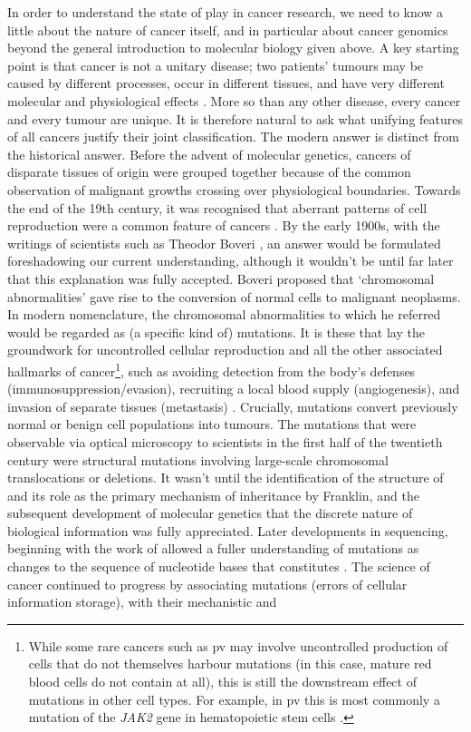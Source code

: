 \documentclass[thesis.tex]{subfiles}
\begin{document}
In order to understand the state of play in cancer research, we need to know a little about the nature of cancer itself, and in particular about cancer genomics beyond the general introduction to molecular biology given above. A key starting point is that cancer is not a unitary disease;  two patients’ tumours may be caused by different processes, occur in different tissues, and have very different molecular and physiological effects \citep{wittekind_tnm_2016}. More so than any other disease, every cancer and every tumour are unique. It is therefore natural to ask what unifying features of all cancers justify their joint classification. The modern answer is distinct from the historical answer. Before the advent of molecular genetics, cancers of disparate tissues of origin were grouped together because of the common observation of malignant growths crossing over physiological boundaries. Towards the end of the 19th century, it was recognised that aberrant patterns of cell reproduction were a common feature of cancers \citep{weinstein_history_2008}. By the early 1900s, with the writings of scientists such as Theodor Boveri \citep[see][for a modern translation]{boveri_concerning_2008}, an answer would be formulated foreshadowing our current understanding, although it wouldn't be until far later that this explanation was fully accepted. Boveri proposed that `chromosomal abnormalities' gave rise to the conversion of normal cells to malignant neoplasms. In modern nomenclature, the chromosomal abnormalities to which he referred would be regarded as (a specific kind of) mutations. It is these that lay the groundwork for uncontrolled cellular reproduction and all the other associated hallmarks of cancer\footnote{While some rare cancers such as \gls{pv} may involve uncontrolled production of cells that do not themselves harbour mutations (in this case, mature red blood cells do not contain  at all), this is still the downstream effect of mutations in other cell types. For example, in \gls{pv} this is most commonly a mutation of the \textit{JAK2} gene in hematopoietic stem cells \citep{tefferi_jak2_2007}.}, such as avoiding detection from the body's defenses (immunosuppression/evasion), recruiting a local blood supply (angiogenesis), and invasion of separate tissues (metastasis) \citep{hanahan_hallmarks_2011}. Crucially, mutations convert previously normal or benign cell populations into tumours. The mutations that were observable via optical microscopy to scientists in the first half of the twentieth century were structural mutations involving large-scale chromosomal translocations or deletions. It wasn't until the identification of the structure of  and its role as the primary mechanism of inheritance by Franklin, \citet{watson_molecular_1953} and the subsequent development of molecular genetics that the discrete nature of biological information was fully appreciated. Later developments in  sequencing, beginning with the work of \citet{sanger_dna_1977} allowed a fuller understanding of mutations as changes to the sequence of nucleotide bases that constitutes . The science of cancer continued to progress by associating  mutations (errors of cellular information storage), with their mechanistic and 
\end{document}
